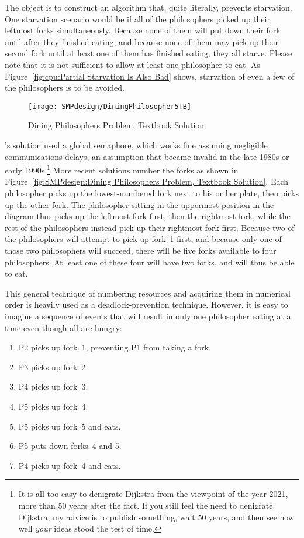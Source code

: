 The object is to construct an algorithm that, quite literally,
prevents starvation.
One starvation scenario would be if all of the philosophers picked up
their leftmost forks simultaneously.
Because none of them will put down their fork until after they finished
eating, and because none of them may pick up their second fork until at
least one of them has finished eating, they all starve.
Please note that it is not sufficient to allow at least one philosopher
to eat.
As Figure~\ref{fig:cpu:Partial Starvation Is Also Bad}
shows, starvation of even a few of the philosophers is to be avoided.

\begin{figure}[tb]
\centering
\texttt{[image: SMPdesign/DiningPhilosopher5TB]}
\caption{Dining Philosophers Problem, Textbook Solution}
\end{figure}

's solution used a global semaphore,
which works fine assuming
negligible communications delays, an assumption that became invalid
in the late 1980s or early 1990s.\footnote{
	It is all too easy to denigrate Dijkstra from the viewpoint
	of the year 2021, more than 50 years after the fact.
	If you still feel the need to denigrate Dijkstra, my advice
	is to publish something, wait 50 years, and then see
	how well \emph{your} ideas stood the test of time.}
More recent solutions number the forks as shown in
Figure~\ref{fig:SMPdesign:Dining Philosophers Problem, Textbook Solution}.
Each philosopher picks up the lowest-numbered fork next to his or her
plate, then picks up the other fork.
The philosopher sitting in the uppermost position in the diagram thus
picks up the leftmost fork first, then the rightmost fork, while the
rest of the philosophers instead pick up their rightmost fork first.
Because two of the philosophers will attempt to pick up fork~1 first,
and because only one of those two philosophers will succeed,
there will be five forks available to four philosophers.
At least one of these four will have two forks, and will thus be able
to eat.

This general technique of numbering resources and acquiring them in
numerical order is heavily used as a deadlock-prevention technique.
However, it is easy to imagine a sequence of events that will result
in only one philosopher eating at a time even though all are hungry:

\begin{enumerate}
    \item P2 picks up fork~1, preventing P1 from taking a fork.
    \item P3 picks up fork~2.
    \item P4 picks up fork~3.
    \item P5 picks up fork~4.
    \item P5 picks up fork~5 and eats.
    \item P5 puts down forks~4 and 5.
    \item P4 picks up fork~4 and eats.
\end{enumerate}

